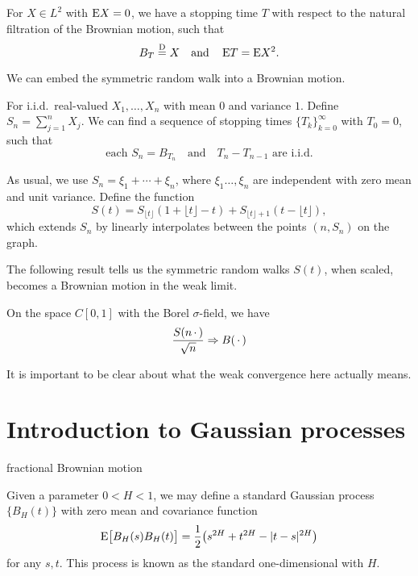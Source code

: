\begin{namedthm}
    For $X \in L^2$ with $\mathop{}\!\mathrm{E} X = 0$, we have a stopping time $T$ with respect to the natural filtration of the Brownian motion, such that \[
        B_T \stackrel{\mathrm{D}}{=} X\quad \text{and} \quad \mathop{}\!\mathrm{E} T = \mathop{}\!\mathrm{E} X^2.
    \]
\end{namedthm}

We can embed the symmetric random walk into a Brownian motion.

\begin{cor}
    For i.i.d.\ real-valued $X_1,\dotsc,X_n$ with mean $0$ and variance $1$. Define $S_n = \sum_{j=1}^n X_j$. We can find a sequence of stopping times $\{T_k\}_{k=0}^\infty$ with $T_0 = 0$, such that \[
        \text{each }S_n = B_{T_n} \quad\text{and}\quad T_n - T_{n-1}\text{ are i.i.d.}
    \]
\end{cor}

As usual, we use $S_n = \xi_1 + \dotsb + \xi_n$, where $\xi_1 \dotsc, \xi_n$ are independent with zero mean and unit variance. Define the function \[
    S(t) = 
        S_{\lfloor t\rfloor} (1 + \lfloor t \rfloor - t) + S_{\lfloor t\rfloor + 1} (t - \lfloor t\rfloor),
\] which extends $S_n$ by linearly interpolates between the points $(n,S_n)$ on the graph.

The following result tells us the symmetric random walks $S(t)$, when scaled, becomes a Brownian motion in the weak limit.

\begin{namedthm}
On the space $C[0,1]$ with the Borel $\sigma$-field, we have 
    \[
        \frac{S(n\,\cdot\,)}{\sqrt{n}}\Rightarrow B(\,\cdot\,)
    \]
\end{namedthm}

It is important to be clear about what the weak convergence here actually means.

\section{Introduction to Gaussian processes}

\begin{namedthm}
    
\end{namedthm}

fractional Brownian motion

Given a parameter $0 < H < 1$, we may define a standard Gaussian process $\{B_H(t)\}$ with zero mean and covariance function \[
    \mathop{}\!\mathrm{E} \bigl[B_H(s)B_H(t)\bigr] = \frac{1}{2}\bigl(s^{2H} + t^{2H} - \lvert t - s \rvert^{2H}\bigr)
\] for any $s,t$. This process is known as the standard one-dimensional  with  $H$.

